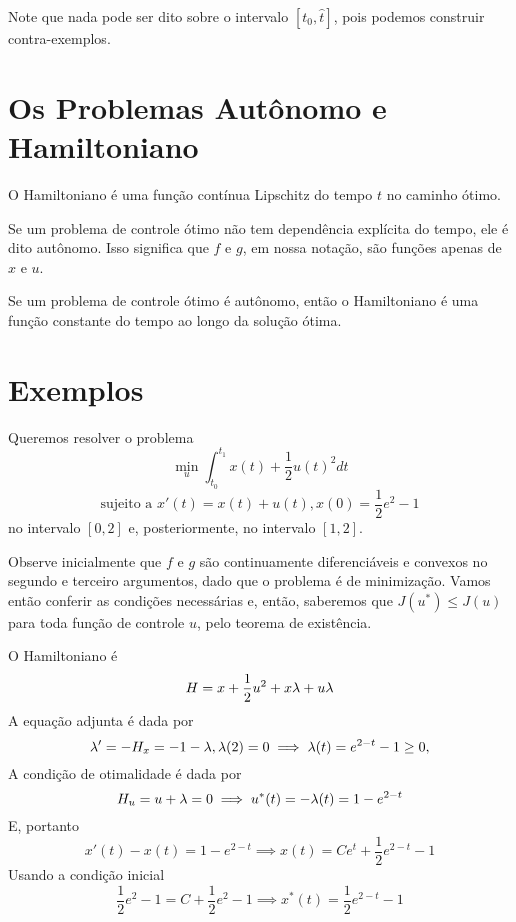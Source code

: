 \begin{remark}
    Note que nada pode ser dito sobre o intervalo $[t_0, \hat{t}]$, pois podemos construir contra-exemplos. 
\end{remark}

\section{Os Problemas Autônomo e Hamiltoniano}

\begin{theorem}
    O Hamiltoniano é uma função contínua Lipschitz do tempo $t$ no caminho
    ótimo. 
\end{theorem}

\begin{definition}[Autônomo]
    Se um problema de controle ótimo não tem dependência explícita do tempo,
    ele é dito autônomo. Isso significa que $f$ e $g$, em nossa notação, são
    funções apenas de $x$ e $u$. 
\end{definition}

\begin{theorem}
    Se um problema de controle ótimo é autônomo, então o Hamiltoniano é uma
    função constante do tempo ao longo da solução ótima. 
\end{theorem}

\section{Exemplos}

\begin{example}
    Queremos resolver o problema 
    $$
    \min_u \int_{t_0}^{t_1} x(t) + \frac{1}{2}u(t)^2 dt
    $$
    $$  
    \text{sujeito a  }x'(t) = x(t) + u(t), x(0) = \frac{1}{2}e^2 - 1
    $$
    no intervalo $[0,2]$ e, posteriormente, no intervalo $[1,2]$.
\end{example}

Observe inicialmente que $f$ e $g$ são continuamente diferenciáveis e convexos no segundo 
e terceiro argumentos, dado que o problema é de minimização. Vamos então conferir as condições 
necessárias e, então, saberemos que $J(u^*) \le J(u)$ para toda função de controle $u$, pelo 
teorema de existência. 

\Space

O Hamiltoniano é 
$$
H = x + \frac{1}{2}u^2 + x \lambda + u \lambda
$$
A equação adjunta é dada por 
$$
\lambda ' = - H_x = -1 - \lambda, \lambda(2) = 0 \implies \lambda(t) = e^{2-t} -1 \ge 0,
$$
A condição de otimalidade é dada por 
$$
H_u = u + \lambda = 0 \implies u^*(t) = -\lambda(t) = 1 - e^{2-t} 
$$
E, portanto 
$$
x'(t) - x(t) = 1 - e^{2-t} \implies x(t) = Ce^t + \frac{1}{2}e^{2-t} - 1
$$
Usando a condição inicial 
$$
\frac{1}{2}e^2 - 1 = C + \frac{1}{2}e^{2} - 1 \implies x^*(t) =  \frac{1}{2}e^{2-t} - 1   
$$

